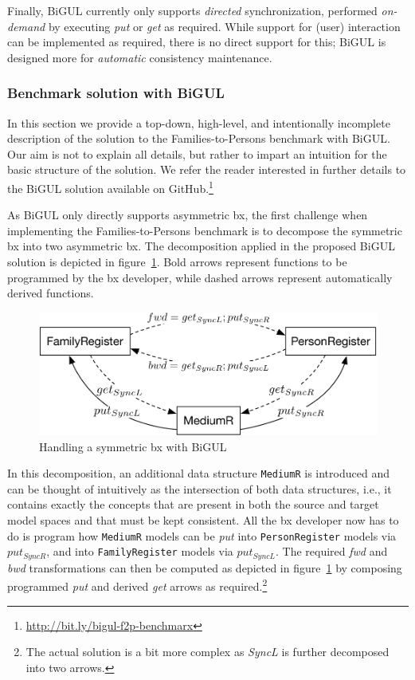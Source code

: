 Finally, BiGUL currently only supports \emph{directed} synchronization, performed \emph{on-demand} by executing \emph{put} or \emph{get} as required.
While support for (user) interaction can be implemented as required, there is no direct support for this; BiGUL is designed more for \emph{automatic} consistency maintenance. 


\subsubsection{Benchmark solution with BiGUL}

In this section we provide a top-down, high-level, and intentionally incomplete description of the solution to the Families-to-Persons benchmark with BiGUL.
Our aim is not to explain all details, but rather to impart an intuition for the basic structure of the solution.
We refer the reader interested in further details to the BiGUL solution available on GitHub.\footnote{\url{http://bit.ly/bigul-f2p-benchmarx}}

As BiGUL only directly supports asymmetric bx, the first challenge when implementing the Families-to-Persons benchmark is to decompose the symmetric bx into two asymmetric bx.
The decomposition applied in the proposed BiGUL solution is depicted in figure~\ref{fig:bigulSolnOverview}.
Bold arrows represent functions to be programmed by the bx developer, while dashed arrows represent automatically derived functions.
%
\begin{figure}[!tbp]
    \centering
    \includegraphics[width=\columnwidth]{diagrams/solutions/bigulSolnOverview}
    \caption{Handling a symmetric bx with BiGUL}
    \label{fig:bigulSolnOverview}
\end{figure}
%
In this decomposition, an additional data structure \texttt{MediumR} is introduced and can be thought of intuitively as the intersection of both data structures, i.e., it contains exactly the concepts that are present in both the source and target model spaces and that must be kept consistent.
All the bx developer now has to do is program how \texttt{MediumR} models can be \emph{put} into \texttt{Person\-Regis\-ter} models via $put_{SyncR}$, and into \texttt{Family\-Regis\-ter} models via $put_{SyncL}$.
The required \emph{fwd} and \emph{bwd} transformations can then be computed as depicted in figure~\ref{fig:bigulSolnOverview} by composing programmed \emph{put} and derived \emph{get} arrows as required.\footnote{The actual solution is a bit more complex as \emph{SyncL} is further decomposed into two arrows.}

